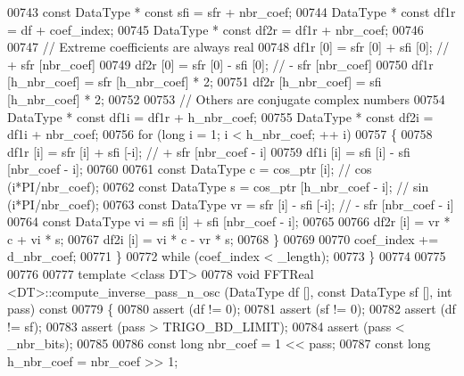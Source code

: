 \begin{DoxyCode}
00743         \textcolor{keyword}{const} DataType  * \textcolor{keyword}{const} sfi = sfr + nbr\_coef;
00744         DataType            * \textcolor{keyword}{const} df1r = df + coef\_index;
00745         DataType            * \textcolor{keyword}{const} df2r = df1r + nbr\_coef;
00746 
00747         \textcolor{comment}{// Extreme coefficients are always real}
00748         df1r [0] = sfr [0] + sfi [0];       \textcolor{comment}{// + sfr [nbr\_coef]}
00749         df2r [0] = sfr [0] - sfi [0];       \textcolor{comment}{// - sfr [nbr\_coef]}
00750         df1r [h\_nbr\_coef] = sfr [h\_nbr\_coef] * 2;
00751         df2r [h\_nbr\_coef] = sfi [h\_nbr\_coef] * 2;
00752 
00753         \textcolor{comment}{// Others are conjugate complex numbers}
00754         DataType * \textcolor{keyword}{const}    df1i = df1r + h\_nbr\_coef;
00755         DataType * \textcolor{keyword}{const}    df2i = df1i + nbr\_coef;
00756         \textcolor{keywordflow}{for} (\textcolor{keywordtype}{long} i = 1; i < h\_nbr\_coef; ++ i)
00757         \{
00758             df1r [i] = sfr [i] + sfi [-i];      \textcolor{comment}{// + sfr [nbr\_coef - i]}
00759             df1i [i] = sfi [i] - sfi [nbr\_coef - i];
00760 
00761             \textcolor{keyword}{const} DataType  c = cos\_ptr [i];                    \textcolor{comment}{// cos (i*PI/nbr\_coef);}
00762             \textcolor{keyword}{const} DataType  s = cos\_ptr [h\_nbr\_coef - i];   \textcolor{comment}{// sin (i*PI/nbr\_coef);}
00763             \textcolor{keyword}{const} DataType  vr = sfr [i] - sfi [-i];        \textcolor{comment}{// - sfr [nbr\_coef - i]}
00764             \textcolor{keyword}{const} DataType  vi = sfi [i] + sfi [nbr\_coef - i];
00765 
00766             df2r [i] = vr * c + vi * s;
00767             df2i [i] = vi * c - vr * s;
00768         \}
00769 
00770         coef\_index += d\_nbr\_coef;
00771     \}
00772     \textcolor{keywordflow}{while} (coef\_index < \_length);
00773 \}
00774 
00775 
00776 
00777 \textcolor{keyword}{template} <\textcolor{keyword}{class} DT>
00778 \textcolor{keywordtype}{void}    FFTReal <DT>::compute\_inverse\_pass\_n\_osc (DataType df [], \textcolor{keyword}{const} DataType sf [], \textcolor{keywordtype}{int} pass) \textcolor{keyword}{const}
00779 \{
00780     assert (df != 0);
00781     assert (sf != 0);
00782     assert (df != sf);
00783     assert (pass > TRIGO\_BD\_LIMIT);
00784     assert (pass < \_nbr\_bits);
00785 
00786     \textcolor{keyword}{const} \textcolor{keywordtype}{long}      nbr\_coef = 1 << pass;
00787     \textcolor{keyword}{const} \textcolor{keywordtype}{long}      h\_nbr\_coef = nbr\_coef >> 1;

\end{DoxyCode}
